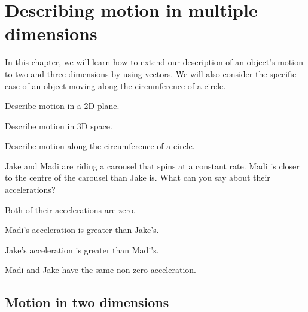 
\chapter{Describing motion in multiple dimensions}
\label{chapter:describingmotioninnd}
In this chapter, we will learn how to extend our description of an object's motion to two and three dimensions by using vectors. We will also consider the specific case of an object moving along the circumference of a circle. 

\begin{learningObjectives}{
 \item Describe motion in a 2D plane.
 \item Describe motion in 3D space.
 \item Describe motion along the circumference of a circle.}
\end{learningObjectives}

\begin{opening}
\begin{MCquestion}{Jake and Madi are riding a carousel that spins at a constant rate. Madi is closer to the centre of the carousel than Jake is. What can you say about their accelerations?}
\item Both of their accelerations are zero.
\item Madi's acceleration is greater than Jake's.
\item Jake's acceleration is greater than Madi's. %
\item Madi and Jake have the same non-zero acceleration.
\end{MCquestion}
\end{opening}

\section{Motion in two dimensions}

